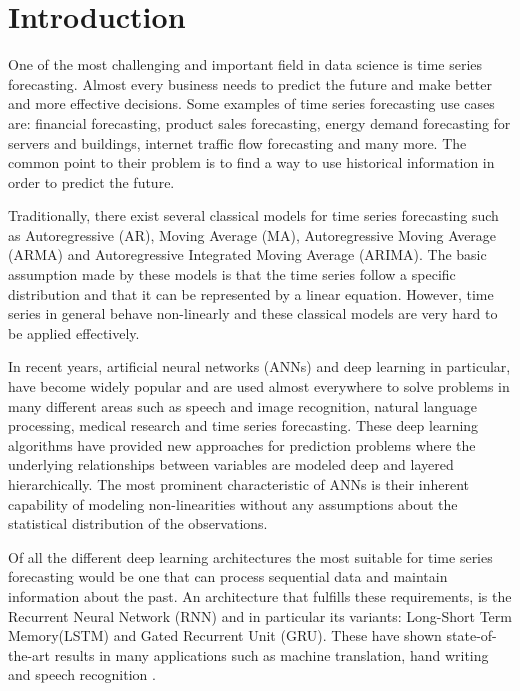 \documentclass[a4paper, 12pt]{article}
\numberwithin{equation}{section}
\numberwithin{figure}{section}
\numberwithin{table}{section}
\begin{document}
	\section{Introduction}
		
	One of the most challenging and important field in data science is time series forecasting. Almost every business needs to predict the future and make better and more effective decisions. Some examples of time series forecasting use cases are: financial forecasting, product sales forecasting, energy demand forecasting for servers and buildings, internet traffic flow forecasting and many more. The common point to their problem is to find a way to use historical information in order to predict the future.\par
	
	Traditionally, there exist several classical models for time series forecasting such as Autoregressive (AR), Moving Average (MA), Autoregressive Moving Average (ARMA) and Autoregressive Integrated Moving Average (ARIMA). The basic assumption made by these models is that the time series follow a specific distribution and that it can be represented by a linear equation. However, time series in general behave non-linearly and these classical models are very hard to be applied effectively.\par
	
	In recent years, artificial neural networks (ANNs) and deep learning in particular, have become widely popular	and are used almost everywhere to solve problems in many different areas such as speech and image recognition, natural language processing, medical research and time series forecasting. These deep learning algorithms have provided new approaches for prediction problems where the underlying relationships between variables are modeled deep and layered hierarchically. The most prominent characteristic of ANNs is their inherent capability of modeling non-linearities without any assumptions about the statistical distribution of the observations.\par
	
	Of all the different deep learning architectures the most suitable for time series forecasting would be one that can process sequential data and maintain information about the past. An architecture that fulfills these requirements, is the Recurrent Neural Network (RNN) and in particular its variants: Long-Short Term Memory(LSTM) and Gated Recurrent Unit (GRU). These have shown state-of-the-art results in many applications such as machine translation, hand writing and speech recognition \cite{hand_writing, speech_recognition, machine_translation}.\par
	
\end{document}

